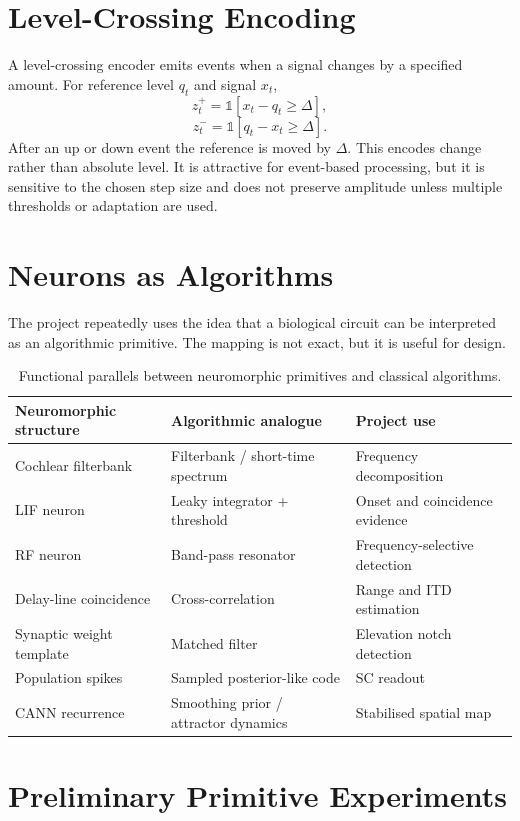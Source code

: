 \documentclass[12pt,a4paper]{report}
\begin{document}
\section{Level-Crossing Encoding}

A level-crossing encoder emits events when a signal changes by a specified amount. For reference level $q_t$ and signal $x_t$,
\[
  z_t^{+} = \mathbb{1}[x_t - q_t \geq \Delta],
\]
\[
  z_t^{-} = \mathbb{1}[q_t - x_t \geq \Delta].
\]
After an up or down event the reference is moved by $\Delta$. This encodes change rather than absolute level. It is attractive for event-based processing, but it is sensitive to the chosen step size and does not preserve amplitude unless multiple thresholds or adaptation are used.

\section{Neurons as Algorithms}

The project repeatedly uses the idea that a biological circuit can be interpreted as an algorithmic primitive. The mapping is not exact, but it is useful for design.

\begin{table}[H]
  \centering
  \caption{Functional parallels between neuromorphic primitives and classical algorithms.}
  \begin{tabular}{lll}
    \toprule
    Neuromorphic structure & Algorithmic analogue & Project use\\
    \midrule
    Cochlear filterbank & Filterbank / short-time spectrum & Frequency decomposition\\
    LIF neuron & Leaky integrator + threshold & Onset and coincidence evidence\\
    RF neuron & Band-pass resonator & Frequency-selective detection\\
    Delay-line coincidence & Cross-correlation & Range and ITD estimation\\
    Synaptic weight template & Matched filter & Elevation notch detection\\
    Population spikes & Sampled posterior-like code & SC readout\\
    CANN recurrence & Smoothing prior / attractor dynamics & Stabilised spatial map\\
    \bottomrule
  \end{tabular}
\end{table}

\section{Preliminary Primitive Experiments}
\end{document}
